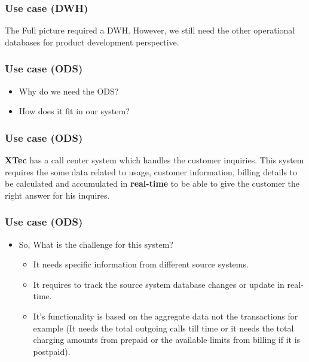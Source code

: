\begin{frame}
\frametitle{Use case (DWH)}
\centering
The Full picture required a DWH. However, we still need the other operational databases for product development perspective.


\end{frame}

\begin{frame}
\frametitle{Use case (ODS)}
\centering

\begin{itemize}[<+->]
\item Why do we need the ODS?
\item 	How does it fit in our system?
\end{itemize}


\end{frame}



\begin{frame}
\frametitle{Use case (ODS)}
\centering
\textbf{XTec} has a call center system which handles the customer inquiries. This system requires the some data related to usage, customer information, billing details to be calculated and accumulated in \textbf{real-time} to be able to give the customer the right answer for his inquires.

\end{frame}
\begin{frame}
\frametitle{Use case (ODS)}

	\begin{itemize}[<+->]
		\item So, What is the challenge for this system?
			\begin{itemize}[<+->]		
				\item It needs specific information from different source systems.
				\item It requires to track the source system database changes or update in real-time.
				\item It's functionality is based on the aggregate data not the transactions for example (It needs the total outgoing calls till time or it needs the total charging amounts from prepaid or the available limits from billing if it is postpaid).
			\end{itemize}
	\end{itemize}

\end{frame}

